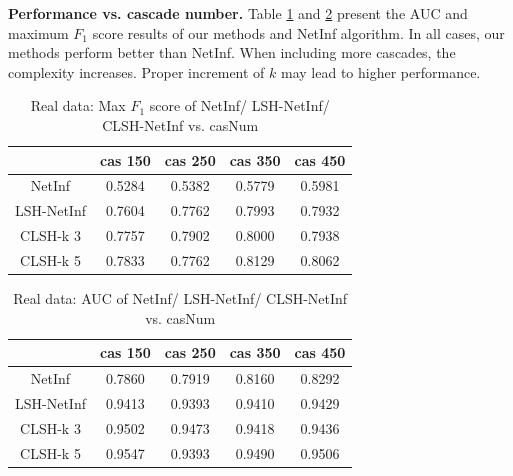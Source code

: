 \begin{itemize}
\textbf{Performance vs. cascade number.} Table \ref{tab:rwdLSHnetinfCASf1} and \ref{tab:rwdLSHnetinfCASauc} present the AUC and maximum $F_1$ score results of our methods and NetInf algorithm. In all cases, our methods perform better than NetInf. When including more cascades, the complexity increases. Proper increment of $k$ may lead to higher performance.
\begin{table}[H]
\caption{Real data: Max $F_1$ score of NetInf/  LSH-NetInf/ CLSH-NetInf vs. casNum}
\begin{tabular}{c|c|c|c|c}
 & cas 150 & cas 250 & cas 350 & cas 450 \\
 \hline
 NetInf & 0.5284 & 0.5382 & 0.5779 & 0.5981 \\
 LSH-NetInf & 0.7604 & 0.7762 & 0.7993 & 0.7932 \\
 CLSH-k 3 & 0.7757 & 0.7902 & 0.8000 & 0.7938 \\
 CLSH-k 5 & 0.7833 & 0.7762 & 0.8129 & 0.8062
\end{tabular}\label{tab:rwdLSHnetinfCASf1}
\end{table}
\begin{table}[H]
\caption{Real data: AUC of NetInf/ LSH-NetInf/ CLSH-NetInf vs. casNum}
\begin{tabular}{c|c|c|c|c}
 & cas 150 & cas 250 & cas 350 & cas 450 \\
 \hline
 NetInf & 0.7860 & 0.7919 & 0.8160 & 0.8292 \\
 LSH-NetInf & 0.9413 & 0.9393 & 0.9410 & 0.9429 \\
 CLSH-k 3 & 0.9502 & 0.9473 & 0.9418 & 0.9436 \\
 CLSH-k 5 & 0.9547 & 0.9393 & 0.9490 & 0.9506
\end{tabular}\label{tab:rwdLSHnetinfCASauc}
\end{table}
\end{itemize}